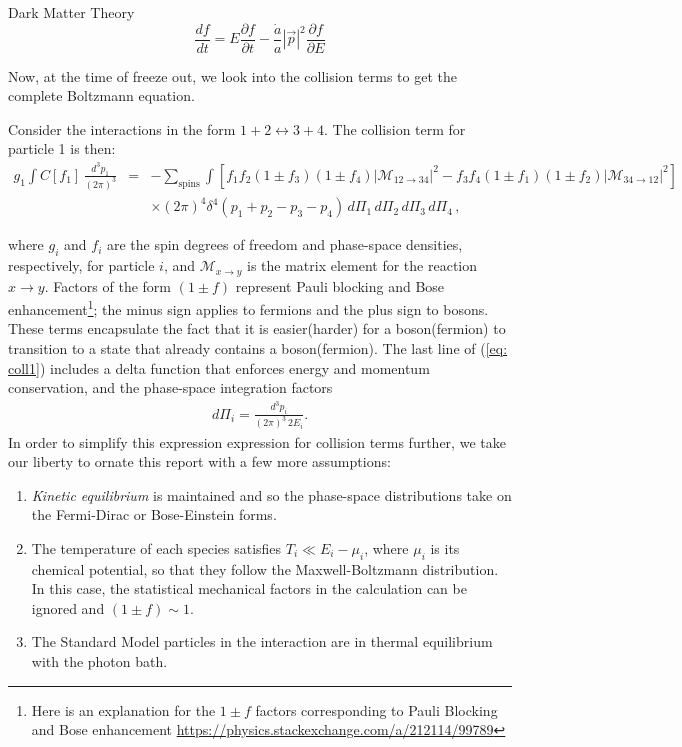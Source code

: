\documentclass[10pt,a4paper]{book}
\begin{document}
\begin{chapter}{Dark Matter Theory}
		\begin{equation}\label{key}
		\dfrac{df}{dt} = E\dfrac{\partial f }{\partial t } - \dfrac{\dot{a}}{a}|\vec{p}|^2 \dfrac{\partial f }{\partial E}
		\end{equation}
		
		Now, at the time of freeze out, we look into the collision terms to get the complete Boltzmann equation.  
		
		Consider the interactions in the form $ 1+2 \leftrightarrow 3+4 $. The collision term for particle 1 is then: 
		\begin{eqnarray}
		g_1 \int C[f_1] \, \frac{d^3 p_1}{(2 \pi)^3} &=& -\sum_\text{spins} \int \left[ f_1 f_2 (1 \pm f_3) (1\pm f_4) |\mathcal{M}_{12\rightarrow34}|^2- f_3 f_4 (1\pm f_1) (1\pm f_2) |\mathcal{M}_{34\rightarrow12}|^2 \right] \nonumber \\ 
		&&  \times (2\pi)^4 \delta^4(p_1 + p_2 -p_3- p_4) \, d \Pi_1 \,  d \Pi_2 \, d \Pi_3 \, d \Pi_4 \, ,
		\label{eq: coll1}
		\end{eqnarray}
		
		where $g_i$ and $f_i$ are the spin degrees of freedom and phase-space densities, respectively, for particle  $i$, and $\mathcal{M}_{x\rightarrow y}$ is the matrix element for the reaction $x\rightarrow y$.  Factors of the form $(1\pm f)$ represent Pauli blocking and Bose enhancement\footnote{Here is an explanation for the $ 1 \pm f $ factors corresponding to Pauli Blocking and Bose enhancement \href{https://physics.stackexchange.com/a/212114/99789}{https://physics.stackexchange.com/a/212114/99789}}; the minus sign applies to fermions and the plus sign to bosons.  These terms encapsulate the fact that it is easier(harder) for a boson(fermion) to transition to a state that already contains a boson(fermion).  The last line of (\ref{eq: coll1}) includes a delta function that enforces energy and momentum conservation, and the phase-space integration factors 
		\begin{align*}
		d\Pi_i =  \frac{d^3 p_i}{(2\pi)^3 \, 2 E_i}. \nonumber  
		\end{align*}
		In order to simplify this expression expression for collision terms further, we take our liberty to ornate this report with a few more assumptions: 
		
		\begin{enumerate}
			\item \emph{Kinetic equilibrium} is maintained and so the phase-space distributions take on the Fermi-Dirac or Bose-Einstein forms.  
			\item The temperature of each species satisfies $T_i \ll E_i - \mu_i$, where $\mu_i$ is its chemical potential, so that they follow the Maxwell-Boltzmann distribution.  In this case, the statistical mechanical factors in the calculation can be ignored and $(1\pm f) \sim 1$. 
			\item The Standard Model particles in the interaction are in thermal equilibrium with the photon bath.  
		\end{enumerate}
		

\end{chapter}
\end{document}
